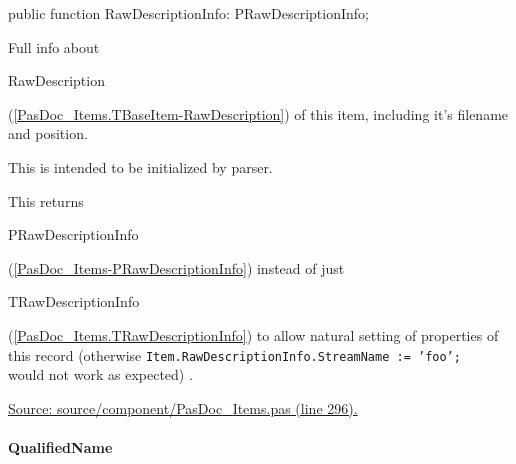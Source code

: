 \documentclass{report}
\newif\ifpdf
\begin{document}
\label{PasDoc_Items.TBaseItem-RawDescriptionInfo}
\begin{list}{}{
\setlength{\itemindent}{0cm}
\setlength{\listparindent}{0cm}
\setlength{\leftmargin}{\evensidemargin}
\addtolength{\leftmargin}{\tmplength}
\settowidth{\labelsep}{X}
\addtolength{\leftmargin}{\labelsep}
\setlength{\labelwidth}{\tmplength}
}
\item[\textbf{Declaration}\hfill]
\ifpdf
\begin{flushleft}
\fi
\begin{ttfamily}
public function RawDescriptionInfo: PRawDescriptionInfo;\end{ttfamily}

\ifpdf
\end{flushleft}
\fi

\par
\item[\textbf{Description}]
Full info about \begin{ttfamily}RawDescription\end{ttfamily}(\ref{PasDoc_Items.TBaseItem-RawDescription}) of this item, including it's filename and position.

This is intended to be initialized by parser.

This returns \begin{ttfamily}PRawDescriptionInfo\end{ttfamily}(\ref{PasDoc_Items-PRawDescriptionInfo}) instead of just \begin{ttfamily}TRawDescriptionInfo\end{ttfamily}(\ref{PasDoc_Items.TRawDescriptionInfo}) to allow natural setting of properties of this record (otherwise \texttt{Item.RawDescriptionInfo.StreamName~:=~'foo';\\
} would not work as expected) .\par
\href{https://github.com/pasdoc/pasdoc/blob/master/source/component/PasDoc_Items.pas#L296}{Source: source/component/PasDoc{\_}Items.pas (line 296).}

\end{list}
\paragraph*{QualifiedName}\hspace*{\fill}
\end{document}
